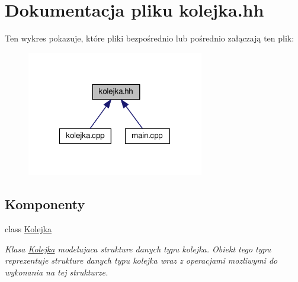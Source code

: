 \hypertarget{kolejka_8hh}{\section{Dokumentacja pliku kolejka.\-hh}
\label{kolejka_8hh}
}
Ten wykres pokazuje, które pliki bezpośrednio lub pośrednio załączają ten plik\-:\nopagebreak
\begin{figure}[H]
\begin{center}
\leavevmode
\includegraphics[width=219pt]{kolejka_8hh__dep__incl}
\end{center}
\end{figure}
\subsection*{Komponenty}
\begin{DoxyCompactItemize}
\item 
class \hyperlink{class_kolejka}{Kolejka}
\begin{DoxyCompactList}\small\item\em Klasa \hyperlink{class_kolejka}{Kolejka} modelujaca strukture danych typu kolejka. Obiekt tego typu reprezentuje strukture danych typu kolejka wraz z operacjami mozliwymi do wykonania na tej strukturze. \end{DoxyCompactList}\end{DoxyCompactItemize}
